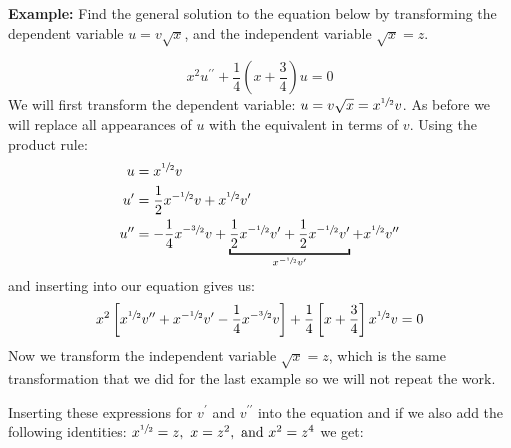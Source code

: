 \vspace{1.0cm}

\noindent\textbf{Example: }Find the general solution to the equation below by transforming the dependent variable $u = v\sqrt{x}$, and the independent variable $\sqrt{x} = z$.

\begin{equation*}
x^2u^{\prime \prime}+\frac{1}{4}\left(x+\frac{3}{4}\right)u = 0
\end{equation*}
\noindent We will first transform the dependent variable: $u=v\sqrt{x} = x^{\sfrac{1}{2}}v$.  As before we will replace all appearances of $u$ with the equivalent in terms of $v$.  Using the product rule:
\begin{align*}
u &= x^{\sfrac{1}{2}}v \\
u^{\prime} &= \frac{1}{2}x^{-\sfrac{1}{2}}v + x^{\sfrac{1}{2}}v^{\prime} \\
u^{\prime \prime} &= -\frac{1}{4}x^{-\sfrac{3}{2}}v+\underbracket{\frac{1}{2}x^{-\sfrac{1}{2}}v^{\prime} + \frac{1}{2}x^{-\sfrac{1}{2}}v^{\prime}}_{x^{-\sfrac{1}{2}}v^{\prime}}+x^{\sfrac{1}{2}}v^{\prime \prime}
\end{align*}
and inserting into our equation gives us:
\begin{equation*}
x^2\left[x^{\sfrac{1}{2}}v^{\prime \prime}+x^{-\sfrac{1}{2}}v^{\prime}-\frac{1}{4}x^{-\sfrac{3}{2}}v \right] + \frac{1}{4}\left[x+\frac{3}{4}\right]x^{\sfrac{1}{2}}v = 0
\end{equation*}
Now we transform the independent variable $\sqrt{x} = z$, which is the same transformation that we did for the last example so we will not repeat the work. 

\noindent Inserting these expressions for $v^{\prime}$ and $v^{\prime \prime}$ into the equation and if we also add the following identities: $x^{\sfrac{1}{2}}=z, \ x=z^2, \ \text{and }x^2=z^4$ we get: 

